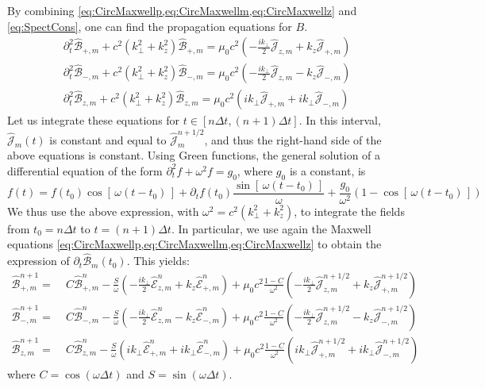 \documentclass[1p,times]{elsarticle}
\newcommand{\tB}[2]{\spectral{B}_{#1,m}^{#2}}
\newcommand{\tE}[2]{\spectral{E}_{#1,m}^{#2}}
\newcommand{\tj}[2]{\spectral{J}_{#1,m}^{#2}}
\renewcommand{\vec}[1]{\boldsymbol{#1}}
\newcommand{\spectral}[1]{\hat{\mathcal{#1}}}
\begin{document}
By combining \cref{eq:CircMaxwellp,eq:CircMaxwellm,eq:CircMaxwellz}
and \cref{eq:SpectCons}, one can find the propagation equations for $B$.
\begin{subequations}
\begin{align}
\partial_t^2 \spectral{B}_{+,m} + c^2(k_\perp ^2+k_z^2) \spectral{B}_{+,m} = 
\mu_0 c^2 \left( - \frac{ik_\perp }{2} \spectral{J}_{z,m} + k_z \spectral{J}_{+,m}
\right) \\
\partial_t^2 \spectral{B}_{-,m} + c^2(k_\perp ^2+k_z^2) \spectral{B}_{-,m} = 
\mu_0 c^2 \left( - \frac{ik_\perp }{2} \spectral{J}_{z,m} - k_z \spectral{J}_{-,m}
\right) \\
\partial_t^2 \spectral{B}_{z,m} + c^2(k_\perp ^2+k_z^2) \spectral{B}_{z,m} =
\mu_0c^2  (ik_\perp  \spectral{J}_{+,m} + ik_\perp \spectral{J}_{-,m} ) 
\end{align}
\end{subequations}
Let us integrate these equations for $t\in [n\Delta t, (n+1)\Delta
t]$. In this interval, $\vec{\spectral{J}}_m(t)$ is constant
and equal to $\vec{\spectral{J}}_m^{n+1/2}$, and thus the right-hand side of the above
equations is constant. Using Green functions, the
general solution of a differential equation of the form 
$\partial_t^2 f + \omega^2 f = g_0$, where $g_0$ is a constant, is 
\begin{equation} f(t) = f(t_0) \cos[\,\omega (t-t_0)\,] + \partial_t f (t_0) \frac{
  \sin[\,\omega (t-t_0)\,]  }{\omega} + \frac{g_0}{\omega^2} (1-
\cos[\,\omega (t-t_0)\,] ) \end{equation}  
We thus use the above expression, with $\omega^2 =c^2(k_\perp^2 +
k_z^2)$, to integrate the fields from $t_0 = n\Delta t$ to $t=(n+1)\Delta t$. In
particular, we use again the Maxwell equations
\cref{eq:CircMaxwellp,eq:CircMaxwellm,eq:CircMaxwellz} to obtain the
expression of $\partial_t \spectral{B}_{m} (t_0)$. This yields:
\begin{subequations}
\begin{align}
\tB{+}{n+1} = \; & C \tB{+}{n} - 
\frac{S}{\omega}\left(-\frac{ik_\perp }{2} \tE{z}{n} + k_z\tE{+}{n}
\right) + \mu_0 c^2\frac{1-C}{\omega^2} \left( -\frac{ik_\perp }{2}
  \tj{z}{n+1/2} + k_z \tj{+}{n+1/2} \right)& \\
\tB{-}{n+1} =\; & C \tB{-}{n} - 
\frac{S}{\omega}\left(- \frac{ik_\perp }{2} \tE{z}{n} - k_z\tE{-}{n}
\right) + \mu_0 c^2\frac{1-C}{\omega^2} \left( - \frac{ik_\perp }{2}
  \tj{z}{n+1/2} - k_z \tj{-}{n+1/2} \right) &\\
\tB{z}{n+1} =\; & C \tB{z}{n} - 
\frac{S}{\omega}\left(ik_\perp \tE{+}{n} + ik_\perp \tE{-}{n}
\right) + \mu_0 c^2\frac{1-C}{\omega^2} \left( ik_\perp
  \tj{+}{n+1/2} + ik_\perp \tj{-}{n+1/2} \right)&
\end{align}
\end{subequations}
where $C = \cos(\omega \Delta t)$ and $S = \sin(\omega \Delta t) $.
\end{document}
